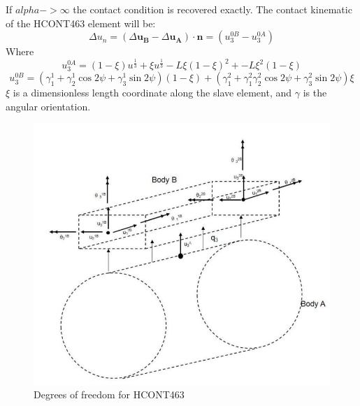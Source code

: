 If $alpha -> \infty$ the contact condition is recovered exactly.\newline
\newline 
\noindent The contact kinematic of the HCONT463 element will be:
\begin{equation}
    \Delta u_n= (\Delta \boldsymbol{u_B} - \Delta \boldsymbol{u_A})  \cdot \boldsymbol{n} = (u_3^{0B} - u_3^{0A})
\end{equation}
Where
\begin{equation}
  u_3^{0A}=(1-\xi)u^{\frac{1}{3}}+\xi u^{\frac{1}{3}}-L \xi (1-\xi)^2 + -L \xi^2(1-\xi)
\end{equation}
\begin{equation}
    u_3^{0B} = (\gamma_1^1 + \gamma_2^1 \cos2\psi+ \gamma_3^1 \sin2\psi)(1-\xi)+(\gamma_1^2 + \gamma_1^2 \gamma_2^2 \cos2\psi+ \gamma_3^2 \sin 2\psi)\xi
\end{equation}
$\xi$ is a dimensionless length coordinate along the slave element, and $\gamma$ is the angular orientation. 
\begin{figure}[H]
\centering
\includegraphics[scale=0.8]{figures/hcont463}
\caption[$\; \:$HCONT463]{Degrees of freedom for HCONT463\cite{Bflextheory2013} }
 \label{fig:HCONT463}
\end{figure}

